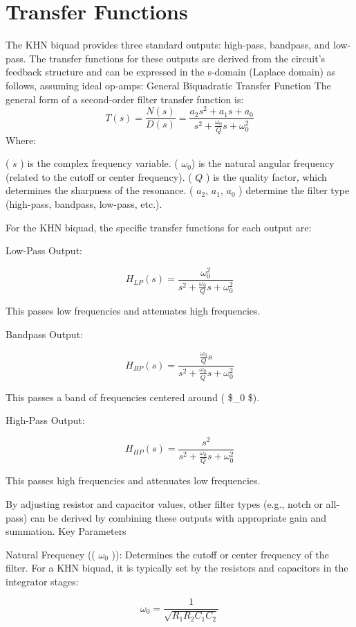 \documentclass[
  letterpaper,
  DIV=11,
  numbers=noendperiod]{scrreprt}
\begin{document}
\section{Transfer Functions}\label{transfer-functions}

The KHN biquad provides three standard outputs: high-pass, bandpass, and
low-pass. The transfer functions for these outputs are derived from the
circuit's feedback structure and can be expressed in the s-domain
(Laplace domain) as follows, assuming ideal op-amps: General Biquadratic
Transfer Function The general form of a second-order filter transfer
function is:
\[T(s) = \frac{N(s)}{D(s)} = \frac{a_2 s^2 + a_1 s + a_0}{s^2 + \frac{\omega_0}{Q} s + \omega_0^2}\]
Where:

( \(s\) ) is the complex frequency variable. ( \(\omega_0\)) is the
natural angular frequency (related to the cutoff or center frequency). (
\(Q\) ) is the quality factor, which determines the sharpness of the
resonance. ( \(a_2\), \(a_1\), \(a_0\) ) determine the filter type
(high-pass, bandpass, low-pass, etc.).

For the KHN biquad, the specific transfer functions for each output are:

Low-Pass Output:

\[H_{LP}(s) = \frac{\omega_0^2}{s^2 + \frac{\omega_0}{Q} s + \omega_0^2}\]

This passes low frequencies and attenuates high frequencies.

Bandpass Output:

\[H_{BP}(s) = \frac{\frac{\omega_0}{Q} s}{s^2 + \frac{\omega_0}{Q} s + \omega_0^2}\]

This passes a band of frequencies centered around ( \$\omega\_0 \$).

High-Pass Output:

\[H_{HP}(s) = \frac{s^2}{s^2 + \frac{\omega_0}{Q} s + \omega_0^2}\]

This passes high frequencies and attenuates low frequencies.

By adjusting resistor and capacitor values, other filter types (e.g.,
notch or all-pass) can be derived by combining these outputs with
appropriate gain and summation. Key Parameters

Natural Frequency (( \(\omega_0\) )): Determines the cutoff or center
frequency of the filter. For a KHN biquad, it is typically set by the
resistors and capacitors in the integrator stages:

\[\omega_0 = \frac{1}{\sqrt{R_1 R_2 C_1 C_2}}\]
\end{document}
